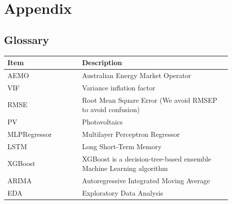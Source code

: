 \documentclass[mstat,12pt]{unswthesis}
\begin{document}



\hypertarget{appendix}{%
\chapter*{Appendix}\label{appendix}}

\hypertarget{glossary}{%
\section*{\texorpdfstring{\textbf{Glossary}}{Glossary}}\label{glossary}}

\begin{table}[H]
\centering
\begin{tabular}{p{0.3\linewidth} | p{0.6\linewidth}} 
\hline\hline
\textbf{Item}               & \textbf{Description}                                                                                                      \\
\hline\hline
AEMO               & Australian Energy Market Operator                                                                                \\
VIF                & Variance inflation factor                                                                                        \\
RMSE               & Root Mean Square Error (We avoid RMSEP to avoid confusion)                                                       \\
PV                 & Photovoltaics                                                                                                    \\
MLPRegressor       & Multilayer Perceptron Regressor                                                                                  \\
LSTM               & Long Short-Term Memory                                                                                           \\
XGBoost            & XGBoost is a decision-tree-based ensemble Machine Learning algorithm                                             \\
ARIMA              & Autoregressive Integrated Moving Average                                                                         \\
EDA                & Exploratory Data Analysis                                                                                        \\

\end{tabular}
\end{table}
\end{document}
